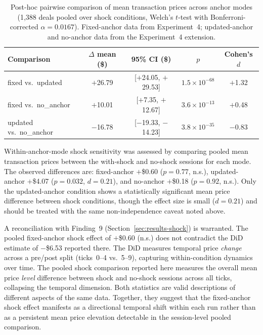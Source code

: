 \begin{table}[ht]
\centering
\caption{Post-hoc pairwise comparison of mean transaction prices across anchor modes (1{,}388 deals pooled over shock conditions, Welch's $t$-test with Bonferroni-corrected $\alpha = 0.0167$).  Fixed-anchor data from Experiment~4; updated-anchor and no-anchor data from the Experiment~4 extension.}
\label{tab:anchor-pairwise}
\begin{tabular}{@{}lcccc@{}}
\toprule
Comparison & $\Delta$ mean (\$) & 95\% CI (\$) & $p$ & Cohen's $d$ \\
\midrule
fixed vs.\ updated    & $+$26.79 & [$+$24.05, $+$29.53] & $1.5 \times 10^{-68}$ & $+$1.32 \\
fixed vs.\ no\_anchor  & $+$10.01 & [$+$7.35, $+$12.67]  & $3.6 \times 10^{-13}$ & $+$0.48 \\
updated vs.\ no\_anchor & $-$16.78 & [$-$19.33, $-$14.23] & $3.8 \times 10^{-35}$ & $-$0.83 \\
\bottomrule
\end{tabular}
\end{table}

Within-anchor-mode shock sensitivity was assessed by comparing pooled mean transaction prices between the with-shock and no-shock sessions for each mode.  The observed differences are: fixed-anchor $+$\$0.60 ($p = 0.77$, n.s.), updated-anchor $+$\$4.07 ($p = 0.032$, $d = 0.21$), and no-anchor $+$\$0.18 ($p = 0.92$, n.s.).  Only the updated-anchor condition shows a statistically significant mean price difference between shock conditions, though the effect size is small ($d = 0.21$) and should be treated with the same non-independence caveat noted above.

A reconciliation with Finding~9 (Section~\ref{sec:results-shock}) is warranted.  The pooled fixed-anchor shock effect of $+$\$0.60 (n.s.) does not contradict the DiD estimate of $-$\$6.53 reported there.  The DiD measures temporal price \emph{change} across a pre/post split (ticks~0--4 vs.\ 5--9), capturing within-condition dynamics over time.  The pooled shock comparison reported here measures the overall mean price \emph{level} difference between shock and no-shock sessions across all ticks, collapsing the temporal dimension.  Both statistics are valid descriptions of different aspects of the same data.  Together, they suggest that the fixed-anchor shock effect manifests as a directional temporal shift within each run rather than as a persistent mean price elevation detectable in the session-level pooled comparison.

